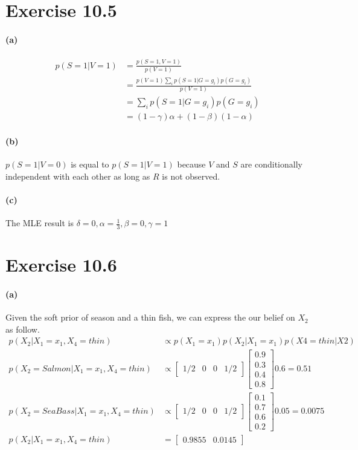 \documentclass[11pt, letterpaper]{article}
\begin{document}
\section{Exercise 10.5}
\paragraph{(a)}
\begin{align*}
    p(S=1|V=1) &= \frac{p(S=1, V=1)}{p(V=1)} \\
        &= \frac{p(V=1) \sum_i p(S=1|G=g_i)p(G=g_i)}{p(V=1)} \\
        &= \sum_i p(S=1|G=g_i)p(G=g_i) \\
        &= (1-\gamma)\alpha + (1-\beta)(1-\alpha)
\end{align*}

\paragraph{(b)}
$p(S=1|V=0)$ is equal to $p(S=1|V=1)$ because $V$ and $S$ are conditionally independent with each other as long as $R$ is not observed.

\paragraph{(c)}
The MLE result is $\delta=0, \alpha=\frac{1}{3}, \beta=0, \gamma=1$


\section{Exercise 10.6}
\paragraph{(a)}
Given the soft prior of season and a thin fish, we can express the our belief on $X_2$ as follow.
\begin{align*}
    p(X_2|X_1=x_1, X_4=thin) &\propto p(X_1=x_1)p(X_2|X_1=x_1)p(X4=thin|X2) \\
    p(X_2=Salmon|X_1=x_1, X_4=thin) &\propto 
        \begin{bmatrix}1/2 & 0 & 0 & 1/2\end{bmatrix}
        \begin{bmatrix}0.9 \\ 0.3 \\ 0.4 \\ 0.8\end{bmatrix}
        0.6 = 0.51 \\
    p(X_2=Sea Bass|X_1=x_1, X_4=thin) &\propto 
        \begin{bmatrix}1/2 & 0 & 0 & 1/2\end{bmatrix}
        \begin{bmatrix}0.1 \\ 0.7 \\ 0.6 \\ 0.2\end{bmatrix}
        0.05 = 0.0075 \\
    p(X_2|X_1=x_1, X_4=thin) &= \begin{bmatrix}0.9855 & 0.0145\end{bmatrix}
\end{align*}
\end{document}

